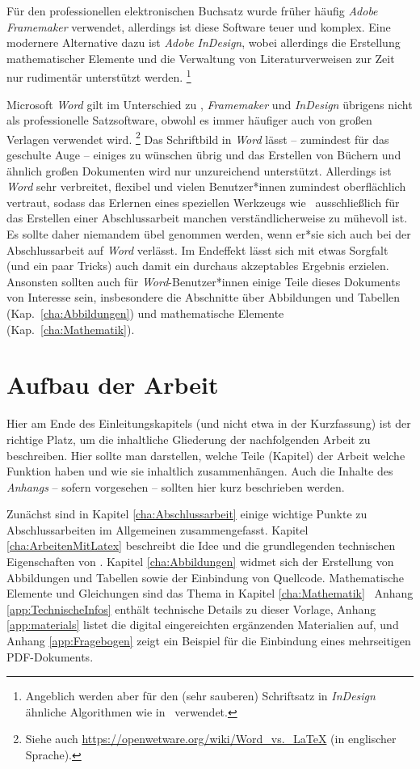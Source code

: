 Für den professionellen elektronischen Buchsatz wurde früher häufig
\emph{Adobe Framemaker} verwendet, allerdings ist diese Software teuer und
komplex. Eine modernere Alternative dazu ist \emph{Adobe InDesign}, wobei
allerdings die Erstellung mathematischer Elemente und die Verwaltung von
Literaturverweisen zur Zeit nur rudimentär unterstützt werden.%
\footnote{Angeblich werden aber für den (sehr sauberen) Schriftsatz in
\emph{InDesign} ähnliche Algorithmen wie in \latex\ verwendet.}

Microsoft \emph{Word} gilt im Unterschied zu \latex, \emph{Framemaker} und
\emph{InDesign} übrigens nicht als professionelle Satzsoftware,
obwohl es immer häufiger auch von großen Verlagen verwendet wird.%
\footnote{Siehe auch \url{https://openwetware.org/wiki/Word_vs._LaTeX} (in
englischer Sprache).}
Das Schriftbild in \emph{Word} lässt -- zumindest für das geschulte Auge --
einiges zu wünschen übrig und das Erstellen von Büchern und ähnlich großen
Dokumenten wird nur unzureichend unterstützt. Allerdings ist \emph{Word} sehr
verbreitet, flexibel und vielen Benutzer*innen zumindest oberflächlich
vertraut, sodass das Erlernen eines speziellen Werkzeugs wie \latex\
ausschließlich für das Erstellen einer Abschlussarbeit manchen
verständlicherweise zu mühevoll ist. Es sollte daher niemandem übel genommen
werden, wenn er*sie sich auch bei der Abschlussarbeit auf \emph{Word}
verlässt. Im Endeffekt lässt sich mit etwas Sorgfalt (und ein paar Tricks)
auch damit ein durchaus akzeptables Ergebnis erzielen. Ansonsten sollten auch
für \emph{Word}-Benutzer*innen einige Teile dieses Dokuments von Interesse
sein, insbesondere die Abschnitte über Abbildungen und Tabellen
(Kap.~\ref{cha:Abbildungen}) und mathematische Elemente
(Kap.~\ref{cha:Mathematik}).


\section{Aufbau der Arbeit}

Hier am Ende des Einleitungskapitels (und nicht etwa in der Kurzfassung) ist
der richtige Platz, um die inhaltliche Gliederung der nachfolgenden Arbeit zu
beschreiben. Hier sollte man darstellen, welche Teile (Kapitel) der Arbeit
welche Funktion haben und wie sie inhaltlich zusammenhängen. Auch die Inhalte
des \emph{Anhangs} -- sofern vorgesehen -- sollten hier kurz beschrieben werden.

Zunächst sind in Kapitel \ref{cha:Abschlussarbeit} einige wichtige Punkte zu
Abschlussarbeiten im Allgemeinen zusammengefasst. Kapitel
\ref{cha:ArbeitenMitLatex} beschreibt die Idee und die grundlegenden
technischen Eigenschaften von \latex. Kapitel \ref{cha:Abbildungen} widmet
sich der Erstellung von Abbildungen und Tabellen sowie der Einbindung von
Quellcode. Mathematische Elemente und Gleichungen sind das Thema in Kapitel
\ref{cha:Mathematik} \usw\ Anhang \ref{app:TechnischeInfos} enthält
technische Details zu dieser Vorlage, Anhang \ref{app:materials} listet die
digital eingereichten ergänzenden Materialien auf, und Anhang \ref{app:Fragebogen} zeigt ein Beispiel für die Einbindung eines
mehrseitigen PDF-Dokuments.
